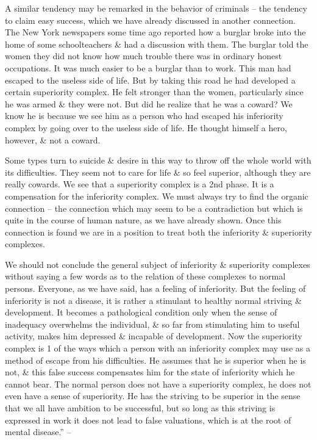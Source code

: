\documentclass{article}
\begin{document}
A similar tendency may be remarked in the behavior of criminals -- the tendency to claim easy success, which we have already discussed in another connection. The New York newspapers some time ago reported how a burglar broke into the home of some schoolteachers \& had a discussion with them. The burglar told the women they did not know how much trouble there was in ordinary honest occupations. It was much easier to be a burglar than to work. This man had escaped to the useless side of life. But by taking this road he had developed a certain superiority complex. He felt stronger than the women, particularly since he was armed \& they were not. But did he realize that he was a coward? We know he is because we see him as a person who had escaped his inferiority complex by going over to the useless side of life. He thought himself a hero, however, \& not a coward.

Some types turn to suicide \& desire in this way to throw off the whole world with its difficulties. They seem not to care for life \& so feel superior, although they are really cowards. We see that a superiority complex is a 2nd phase. It is a compensation for the inferiority complex. We must always try to find the organic connection -- the connection which may seem to be a contradiction but which is quite in the course of human nature, as we have already shown. Once this connection is found we are in a position to treat both the inferiority \& superiority complexes.

We should not conclude the general subject of inferiority \& superiority complexes without saying a few words as to the relation of these complexes to normal persons. Everyone, as we have said, has a feeling of inferiority. But the feeling of inferiority is not a disease, it is rather a stimulant to healthy normal striving \& development. It becomes a pathological condition only when the sense of inadequacy overwhelms the individual, \& so far from stimulating him to useful activity, makes him depressed \& incapable of development. Now the superiority complex is 1 of the ways which a person with an inferiority complex may use as a method of escape from his difficulties. He assumes that he is superior when he is not, \& this false success compensates him for the state of inferiority which he cannot bear. The normal person does not have a superiority complex, he does not even have a sense of superiority. He has the striving to be superior in the sense that we all have ambition to be successful, but so long as this striving is expressed in work it does not lead to false valuations, which is at the root of mental disease.'' -- \cite[pp. 78--97]{Adler_science_living}
\end{document}
